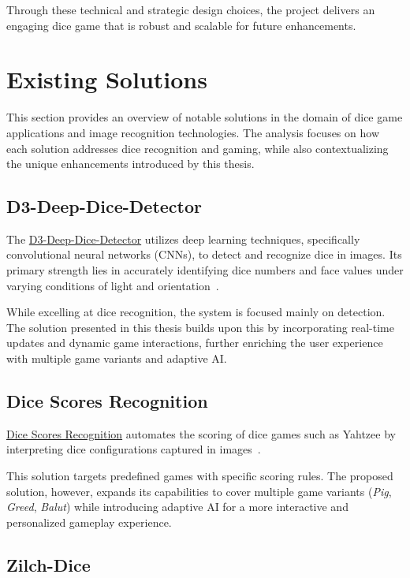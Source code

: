 Through these technical and strategic design choices, the project delivers an engaging dice game that is robust and scalable for future enhancements.


\section{Existing Solutions}

This section provides an overview of notable solutions in the domain of dice game applications and image recognition technologies. The analysis focuses on how each solution addresses dice recognition and gaming, while also contextualizing the unique enhancements introduced by this thesis.

\subsection{D3-Deep-Dice-Detector}

The \href{https://github.com/harshmunshi/D3-Deep-Dice-Detector}{D3-Deep-Dice-Detector} utilizes deep learning techniques, specifically convolutional neural networks (CNNs), to detect and recognize dice in images. Its primary strength lies in accurately identifying dice numbers and face values under varying conditions of light and orientation~\cite{bib:D3-Dice}.

While excelling at dice recognition, the system is focused mainly on detection. The solution presented in this thesis builds upon this by incorporating real-time updates and dynamic game interactions, further enriching the user experience with multiple game variants and adaptive AI.

\subsection{Dice Scores Recognition}

\href{https://github.com/ordovas/dice-scores-recognition}{Dice Scores Recognition} automates the scoring of dice games such as Yahtzee by interpreting dice configurations captured in images~\cite{bib:Dice-Scores-Recognition}.

This solution targets predefined games with specific scoring rules. The proposed solution, however, expands its capabilities to cover multiple game variants (\emph{Pig}, \emph{Greed}, \emph{Balut}) while introducing adaptive AI for a more interactive and personalized gameplay experience.

\subsection{Zilch-Dice}

